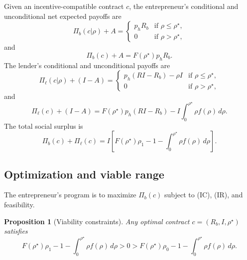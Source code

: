 \documentclass[11pt,a4paper,oneside]{book}
\def\leq{\leqslant}
\theoremstyle{plain}
\newtheorem{proposition}[theorem]{Proposition}
\theoremstyle{definition}
\theoremstyle{remark}
\numberwithin{equation}{chapter}
\begin{document}
Given an incentive-compatible contract $c$, the entrepreneur's conditional and unconditional net expected payoffs are
\begin{equation}\label{eq:LS-Pi-b-cond}
  \Pi_b(c \vert \rho) + A = \begin{cases}
    p_h R_b & \text{if } \rho \leq \rho^\star, \\
    0 & \text{if } \rho > \rho^\star,
  \end{cases}
\end{equation}
and
\begin{equation}\label{eq:LS-Pi-b-uncond}
  \Pi_b(c) + A = F(\rho^\star) p_h R_b.
\end{equation}
The lender's conditional and unconditional payoffs are
\begin{equation}\label{eq:LS-Pi-ell-cond}
  \Pi_\ell(c \vert \rho) + (I-A) = \begin{cases}
    p_h(RI - R_b) - \rho I & \text{if } \rho \leq \rho^\star, \\
    0 & \text{if } \rho > \rho^\star,
  \end{cases}
\end{equation}
and
\begin{equation}\label{eq:LS-Pi-ell-uncond}
  \Pi_\ell(c) + (I-A) = F(\rho^\star) p_h (RI - R_b) - I \int_0^{\rho^\star} \rho f(\rho) \, d\rho.
\end{equation}
The total social surplus is
\begin{equation}\label{eq:LS-surplus}
  \Pi_b(c) + \Pi_\ell(c) = I \left[ F(\rho^\star) \rho_1 - 1 - \int_0^{\rho^\star} \rho f(\rho) \, d\rho \right].
\end{equation}

\subsection{Optimization and viable range}

The entrepreneur's program is to maximize $\Pi_b(c)$ subject to (IC), (IR), and feasibility.

\begin{proposition}[Viability constraints]\label{prop:LS-viable-range}
Any optimal contract $c = (R_b, I, \rho^\star)$ satisfies
\begin{equation}\label{eq:LS-viable-range}
  F(\rho^\star) \rho_1 - 1 - \int_0^{\rho^\star} \rho f(\rho) \, d\rho > 0 > F(\rho^\star) \rho_0 - 1 - \int_0^{\rho^\star} \rho f(\rho) \, d\rho.
\end{equation}
\end{proposition}
\end{document}
